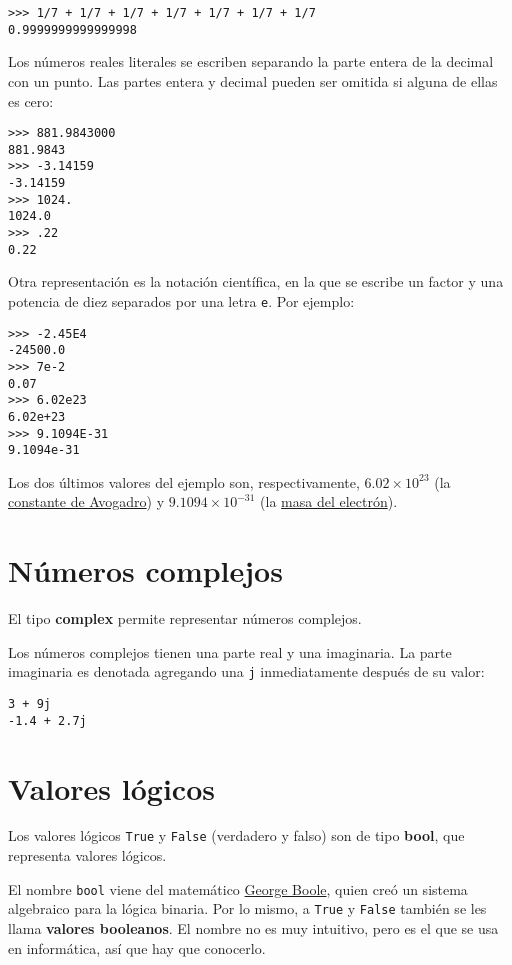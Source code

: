\begin{lstlisting}
>>> 1/7 + 1/7 + 1/7 + 1/7 + 1/7 + 1/7 + 1/7
0.9999999999999998
\end{lstlisting}

Los números reales literales se escriben separando la parte entera de la
decimal con un punto. Las partes entera y decimal pueden ser omitida si
alguna de ellas es cero:

\begin{lstlisting}
>>> 881.9843000
881.9843
>>> -3.14159
-3.14159
>>> 1024.
1024.0
>>> .22
0.22
\end{lstlisting}

Otra representación es la notación científica, en la que se escribe un
factor y una potencia de diez separados por una letra \lstinline!e!. Por
ejemplo:

\begin{lstlisting}
>>> -2.45E4
-24500.0
>>> 7e-2
0.07
>>> 6.02e23
6.02e+23
>>> 9.1094E-31
9.1094e-31
\end{lstlisting}

Los dos últimos valores del ejemplo son, respectivamente,
$6.02\times 10^{23}$ (la
\href{http://es.wikipedia.org/wiki/Constante\_de\_Avogadro}{constante de
Avogadro}) y $9.1094\times 10^{-31}$ (la
\href{http://es.wikipedia.org/wiki/Electr\%C3\%B3n\#Propiedades}{masa
del electrón}).

\section{Números complejos}

El tipo \textbf{complex} permite representar números complejos.

Los números complejos tienen una parte real y una imaginaria. La parte
imaginaria es denotada agregando una \lstinline!j! inmediatamente
después de su valor:

\begin{lstlisting}
3 + 9j
-1.4 + 2.7j
\end{lstlisting}

\section{Valores lógicos}

Los valores lógicos \lstinline!True! y \lstinline!False! (verdadero y
falso) son de tipo \textbf{bool}, que representa valores lógicos.

El nombre \lstinline!bool! viene del matemático
\href{http://es.wikipedia.org/wiki/George\_Boole}{George Boole}, quien
creó un sistema algebraico para la lógica binaria. Por lo mismo, a
\lstinline!True! y \lstinline!False! también se les llama
\textbf{valores booleanos}. El nombre no es muy intuitivo, pero es el
que se usa en informática, así que hay que conocerlo.

